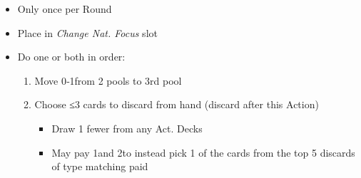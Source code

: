 \documentclass[10pt]{article}
\begin{document}
\begin{itemize}
	\item Only once per Round
	\item Place \cube in \emph{Change Nat. Focus} slot
	\item Do one or both in order:
	\begin{enumerate}
		\item Move 0‑1\monarchpower from 2 pools to 3rd pool
		\item Choose ≤3 cards to discard from hand (discard after this Action)
		\begin{itemize}
			\item Draw 1 fewer from any Act. Decks
			\item May pay 1\monarchpower and 2\ducats to instead pick 1 of the cards from the top 5 discards of type matching paid \monarchpower
		\end{itemize}
	\end{enumerate}
\end{itemize}
\end{document}
